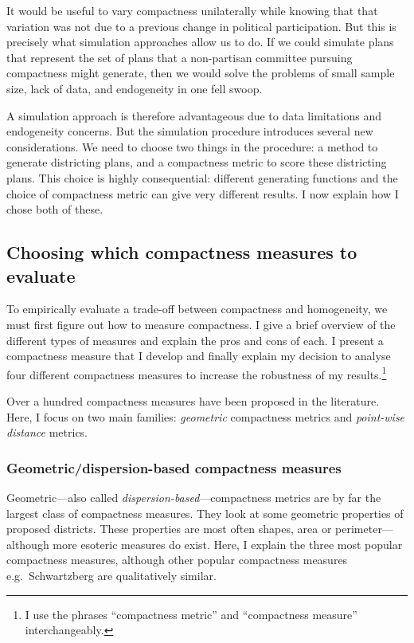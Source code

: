 \documentclass[]{article}
\begin{document}
It would be useful to vary compactness unilaterally while knowing that
that variation was not due to a previous change in political
participation. But this is precisely what simulation approaches allow us
to do. If we could simulate plans that represent the set of plans that a
non-partisan committee pursuing compactness might generate, then we
would solve the problems of small sample size, lack of data, and
endogeneity in one fell swoop.

A simulation approach is therefore advantageous due to data limitations
and endogeneity concerns. But the simulation procedure introduces
several new considerations. We need to choose two things in the
procedure: a method to generate districting plans, and a compactness
metric to score these districting plans. This choice is highly
consequential: different generating functions and the choice of
compactness metric can give very different results. I now explain how I
chose both of these.

\hypertarget{choosing-which-compactness-measures-to-evaluate}{%
\subsection{Choosing which compactness measures to
evaluate}\label{choosing-which-compactness-measures-to-evaluate}}

To empirically evaluate a trade-off between compactness and homogeneity,
we must first figure out how to measure compactness. I give a brief
overview of the different types of measures and explain the pros and
cons of each. I present a compactness measure that I develop and finally
explain my decision to analyse four different compactness measures to
increase the robustness of my results.\footnote{I use the phrases
  ``compactness metric'' and ``compactness measure'' interchangeably.}

Over a hundred compactness measures have been proposed in the
literature. Here, I focus on two main families: \emph{geometric}
compactness metrics and \emph{point-wise distance} metrics.

\hypertarget{geometricdispersion-based-compactness-measures}{%
\subsubsection{Geometric/dispersion-based compactness
measures}\label{geometricdispersion-based-compactness-measures}}

Geometric---also called \emph{dispersion-based}---compactness metrics
are by far the largest class of compactness measures. They look at some
geometric properties of proposed districts. These properties are most
often shapes, area or perimeter---although more esoteric measures do
exist. Here, I explain the three most popular compactness measures,
although other popular compactness measures e.g.~Schwartzberg are
qualitatively similar.
\end{document}

